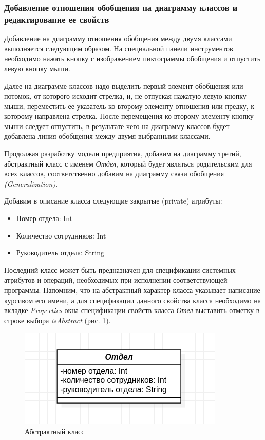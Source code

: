 \documentclass[a4paper,12pt]{report}
\begin{document}
\subsubsection*{Добавление отношения обобщения на диаграмму классов и редактирование ее свойств}
Добавление на диаграмму отношения обобщения между двумя классами выполняется следующим образом. На специальной панели инструментов необходимо нажать кнопку с изображением пиктограммы обобщения и отпустить левую кнопку мыши. 

Далее на диаграмме классов надо выделить первый элемент обобщения или потомок, от которого исходит стрелка, и, не отпуская нажатую левую кнопку мыши, переместить ее указатель ко второму элементу отношения или предку, к которому направлена стрелка. После перемещения ко второму элементу кнопку мыши следует отпустить, в результате чего на диаграмму классов будет добавлена линия обобщения между двумя выбранными классами.

Продолжая разработку модели предприятия, добавим на диаграмму третий, абстрактный класс с именем \textit{Отдел}, который будет являться родительским для всех классов, соответственно добавим на диаграмму связи обобщения \textit{(Generalization)}. 

Добавим в описание класса следующие закрытые (private) атрибуты:
\begin{itemize}
	\item Номер отдела: Int
	\item Количество сотрудников: Int
	\item Руководитель отдела: String
\end{itemize}

Последний класс может быть предназначен для спецификации системных атрибутов и операций, необходимых при исполнении соответствующей программы. Напомним, что на абстрактный характер класса указывает написание курсивом его имени, а для спецификации данного свойства класса необходимо на вкладке \textit{Properties} окна спецификации свойств класса \textit{Отел} выставить отметку в строке выбора \textit{isAbstract} (рис. \ref{fig:department}).

\begin{figure}
	\centering
	\includegraphics[width=0.7\linewidth]{images/department}
	\caption{Абстрактный класс}
	\label{fig:department}
\end{figure}
\end{document}
